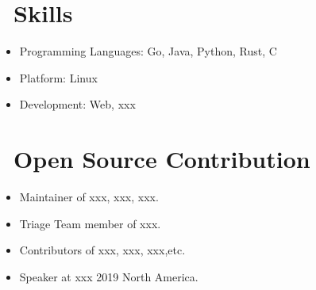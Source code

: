 \documentclass{resume}
\begin{document}
\section{\faCogs\ Skills}
\begin{itemize}[parsep=0.5ex]
  \item Programming Languages: Go, Java, Python, Rust, C
  \item Platform: Linux
  \item Development: Web, xxx
\end{itemize}

\section{\faInfo\ Open Source Contribution}
\begin{itemize}[parsep=0.5ex]
  \item Maintainer of xxx, xxx, xxx.
  \item Triage Team member of xxx.
  \item Contributors of xxx, xxx, xxx,etc.
  \item Speaker at xxx 2019 North America.
\end{itemize}
\end{document}
